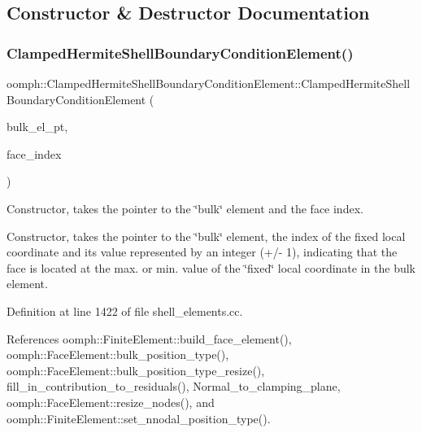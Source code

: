 \subsection{Constructor \& Destructor Documentation}
\mbox{\label{classoomph_1_1ClampedHermiteShellBoundaryConditionElement_ac2c060fc25233cb0c73fdff218c25922}} 
\subsubsection{\texorpdfstring{Clamped\+Hermite\+Shell\+Boundary\+Condition\+Element()}{ClampedHermiteShellBoundaryConditionElement()}\hspace{0.1cm}{\footnotesize\ttfamily [1/3]}}
{\footnotesize\ttfamily oomph\+::\+Clamped\+Hermite\+Shell\+Boundary\+Condition\+Element\+::\+Clamped\+Hermite\+Shell\+Boundary\+Condition\+Element (\begin{DoxyParamCaption}\item[{\hyperlink{classoomph_1_1FiniteElement}{Finite\+Element} $\ast$const \&}]{bulk\+\_\+el\+\_\+pt,  }\item[{const int \&}]{face\+\_\+index }\end{DoxyParamCaption})}



Constructor, takes the pointer to the \char`\"{}bulk\char`\"{} element and the face index. 

Constructor, takes the pointer to the \char`\"{}bulk\char`\"{} element, the index of the fixed local coordinate and its value represented by an integer (+/-\/ 1), indicating that the face is located at the max. or min. value of the \char`\"{}fixed\char`\"{} local coordinate in the bulk element. 

Definition at line 1422 of file shell\+\_\+elements.\+cc.



References oomph\+::\+Finite\+Element\+::build\+\_\+face\+\_\+element(), oomph\+::\+Face\+Element\+::bulk\+\_\+position\+\_\+type(), oomph\+::\+Face\+Element\+::bulk\+\_\+position\+\_\+type\+\_\+resize(), fill\+\_\+in\+\_\+contribution\+\_\+to\+\_\+residuals(), Normal\+\_\+to\+\_\+clamping\+\_\+plane, oomph\+::\+Face\+Element\+::resize\+\_\+nodes(), and oomph\+::\+Finite\+Element\+::set\+\_\+nnodal\+\_\+position\+\_\+type().

